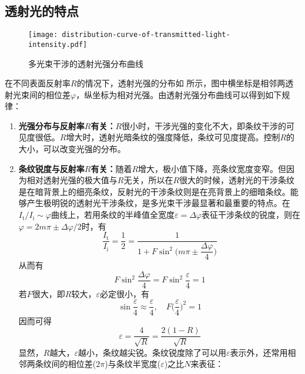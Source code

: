 \documentclass[cn,10pt,chinesefont=founder,math=mtpro2,cite=super,toc=onecol,twoside,openany]{elegantbook}
\begin{document}
\subsection{透射光的特点}
\begin{figure}[htbp]
	\centering
	\texttt{[image: distribution-curve-of-transmitted-light-intensity.pdf]}
	\caption{多光束干涉的透射光强分布曲线}
	\label{fig:distribution-curve-of-transmitted-light-intensity}
\end{figure}
在不同表面反射率$R$的情况下，透射光强的分布如 所示，图中横坐标是相邻两透射光束间的相位差$\varphi$，纵坐标为相对光强。由透射光强分布曲线可以得到如下规律：
\begin{enumerate}
	\item \textbf{光强分布与反射率$R$有关：}$R$很小时，干涉光强的变化不大，即条纹干涉的可见度很低。$R$增大时，透射光暗条纹的强度降低，条纹可见度提高。控制$R$的大小，可以改变光强的分布。
	\item \textbf{条纹锐度与反射率$R$有关：}随着$R$增大，极小值下降，亮条纹宽度变窄。但因为相对透射光强的极大值与$R$无关，所以在$R$很大的时候，透射光的干涉条纹是在暗背景上的细亮条纹，反射光的干涉条纹则是在亮背景上的细暗条纹。能够产生极明锐的透射光干涉条纹，是多光束干涉最显著和最重要的特点。在$I_{\mathrm{t}}/I_{\mathrm{i}}\sim\varphi$曲线上，若用条纹的半峰值全宽度$\varepsilon=\Delta\varphi$表征干涉条纹的锐度，则在$\varphi=2m\pi\pm\Delta\varphi/2$时，有
	\begin{equation}
	\frac{I_{\mathrm{t}}}{I_{\mathrm{i}}}=\frac{1}{2}=\frac{1}{1+F\sin^2\bigg(m\pi\pm\dfrac{\Delta\varphi}{4}\bigg)}
	\end{equation}
	从而有
	\begin{equation}
	F\sin^2\frac{\Delta\varphi}{4}=F\sin^2\frac{\varepsilon}{4}=1
	\end{equation}
	若$F$很大，即$R$较大，$\varepsilon$必定很小，有
	\begin{equation}
	\sin\frac{\varepsilon}{4}\approx\frac{\varepsilon}{4},\quad F\bigg(\frac{\varepsilon}{4}\bigg)^2=1
	\end{equation}
	因而可得
	\begin{equation}
	\varepsilon=\frac{4}{\sqrt{R}}=\frac{2(1-R)}{\sqrt{R}}
	\label{eq:relationship-between-half-width-and-reflectivity}
	\end{equation}
	显然，$R$越大，$\varepsilon$越小，条纹越尖锐。条纹锐度除了可以用$\varepsilon$表示外，还常用相邻两条纹间的相位差($2\pi$)与条纹半宽度($\varepsilon$)之比$N$来表征：
	\begin{equation}

\end{equation}
\end{enumerate}
\end{document}
